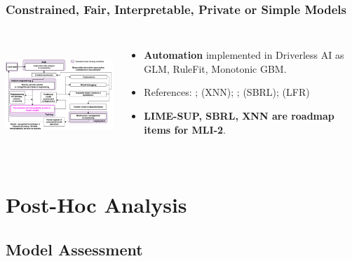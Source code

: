 \documentclass[11pt,
               aspectratio=169,
               hyperref={colorlinks}
               ]{beamer}
\begin{document}
			\begin{frame}
		
				\frametitle{Constrained, Fair, Interpretable, Private or Simple Models}		
			
				\begin{columns}
	
					\centering
					\includegraphics[height=120pt]{img/im.png}
				
					\vspace{-5pt}
					\small
					\begin{itemize}
						\item \textbf{Automation} implemented in Driverless AI as GLM, RuleFit, Monotonic GBM.
						\item References: ;  (XNN); ;  (SBRL);  (LFR)	
						\item \textbf{LIME-SUP, SBRL, XNN are roadmap items for MLI-2}. 
					\end{itemize}
					\normalsize
				
				\end{columns}			
			
			\end{frame}

	\section{Post-Hoc Analysis}

		\subsection{Model Assessment}
\end{document}
